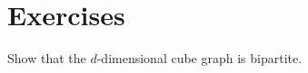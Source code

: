 \documentclass[nobib]{tufte-handout}
\begin{document}
\section{Exercises}

\begin{xca}
    Show that the $d$-dimensional cube graph is bipartite.
\end{xca}


%
%
\end{document}

